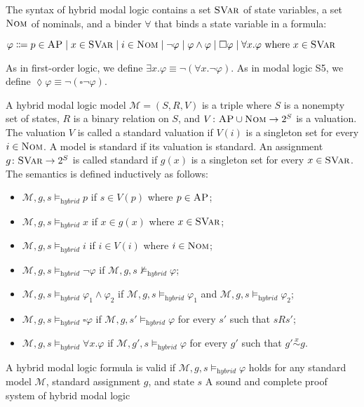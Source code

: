 \documentclass[acmsmall,review,anonymous]{acmart}
\newcommand{\SVar}{\textnormal{\textsc{SVar}}}
\newcommand{\Nom}{\textnormal{\textsc{Nom}}}
\newcommand{\MM}{\mathcal{M}}
\newcommand{\pset}[1]{2^{#1}}
\newcommand{\simon}[1]{\overset{#1}{\sim}}
\newcommand{\simx}{\simon{x}}
\newcommand{\hybridModalLogic}{\textit{hybrid}}
\newcommand{\AP}{\textsc{AP}}
\newcommand{\always}{{\square}}
\newcommand{\eventually}{{\lozenge}}
\begin{document}
The syntax of hybrid modal logic contains
a set $\SVar$ of state variables,
a set $\Nom$ of nominals,
and a binder $\forall$ that binds a state variable in a formula:
\begin{center}
$\varphi \Coloneqq
p \in \AP \mid x \in \SVar \mid i \in \Nom \mid
\neg \varphi \mid \varphi \wedge \varphi \mid
\always \varphi \mid \forall x . \varphi \text{ where $x \in \SVar$}
	$
\end{center}
As in first-order logic,
we define $\exists x . \varphi \equiv \neg (\forall x . \neg \varphi)$.
As in modal logic S5,
we define $\eventually \varphi \equiv \neg (\always \neg \varphi)$.

A hybrid modal logic model
$\MM = (S, R, V)$ is a triple where
$S$ is a nonempty set of states,
$R$ is a binary relation on $S$,
and $V \colon \AP \cup \Nom \to \pset{S}$ is a valuation.
The valuation $V$ is called a standard valuation if $V(i)$ is a singleton set
for every $i \in \Nom$.
A model is standard if its valuation is standard.
An assignment $g \colon \SVar \to \pset{S}$ is called standard
if $g(x)$ is a singleton set for every $x \in \SVar$.
The semantics is defined inductively as follows:
\begin{itemize}
\item $\MM,g,s \vDash_\hybridModalLogic p$
      if $s \in V(p)$ where $p \in \AP$;
\item $\MM,g,s \vDash_\hybridModalLogic x$
      if $x \in g(x)$ where $x \in \SVar$;
\item $\MM,g,s \vDash_\hybridModalLogic i$
      if $i \in V(i)$ where $i \in \Nom$;
\item $\MM,g,s \vDash_\hybridModalLogic \neg \varphi$
      if $\MM,g,s \not \vDash_\hybridModalLogic \varphi$;
\item $\MM,g,s \vDash_\hybridModalLogic \varphi_1 \wedge \varphi_2$
      if  $\MM,g,s \vDash_\hybridModalLogic \varphi_1$
      and $\MM,g,s \vDash_\hybridModalLogic \varphi_2$;
\item $\MM,g,s \vDash_\hybridModalLogic \always \varphi$
      if $\MM,g,s' \vDash_\hybridModalLogic \varphi$
      for every $s'$ such that $s R s'$;
\item $\MM,g,s \vDash_\hybridModalLogic \forall x . \varphi$
      if $\MM,g',s \vDash_\hybridModalLogic \varphi$
      for every $g'$ such that $g' \simx g$.
\end{itemize}
A hybrid modal logic formula is valid
if $\MM,g,s \vDash_\hybridModalLogic \varphi$ 
holds for any standard model $\MM$, standard assignment $g$, and state $s$
A sound and complete proof system of hybrid modal logic
\end{document}

